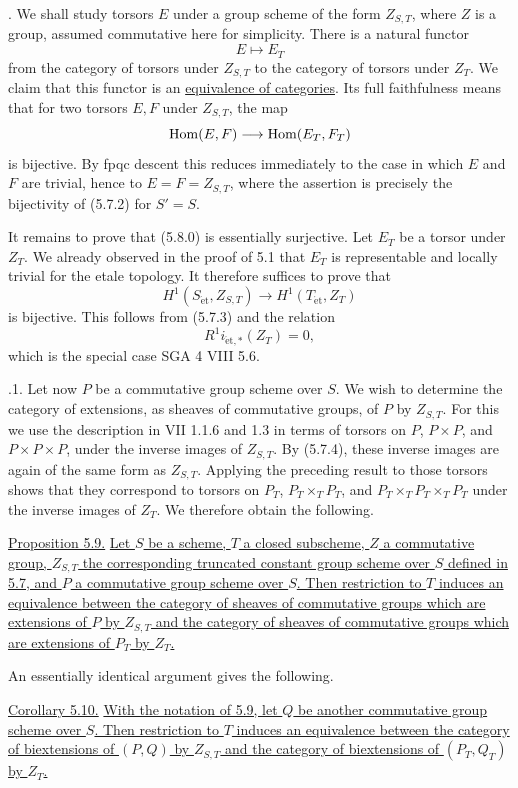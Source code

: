 \medskip
{}.  We shall study torsors $E$ under a group scheme of the
form $Z_{S,T}$, where $Z$ is a group, assumed commutative here for
simplicity.  There is a natural functor
\begin{equation}\tag{5.8.0}
 E\longmapsto E_T
\end{equation}
from the category of torsors under $Z_{S,T}$ to the category of
torsors under $Z_T$.  We claim that this functor is an
\underline{equivalence of categories}.  Its full faithfulness means
that for two torsors $E,F$ under $Z_{S,T}$, the map
\[
 \operatorname{Hom}(E,F)\longrightarrow\operatorname{Hom}(E_T,F_T)
\]
is bijective.  By fpqc descent this reduces immediately to the case in
which $E$ and $F$ are trivial, hence to $E=F=Z_{S,T}$, where the
assertion is precisely the bijectivity of (5.7.2) for $S'=S$.

It remains to prove that (5.8.0) is essentially surjective.  Let $E_T$
be a torsor under $Z_T$.  We already observed in the proof of 5.1 that
$E_T$ is representable and locally trivial for the etale topology.  It
therefore suffices to prove that
\[
 H^1(S_{\mathrm{\acute{e}t}},Z_{S,T})
 \longrightarrow H^1(T_{\mathrm{\acute{e}t}},Z_T)
\]
is bijective.  This follows from (5.7.3) and the relation
\[
 R^1i_{\mathrm{\acute{e}t},*}(Z_T)=0,
\]
which is the special case SGA 4 VIII 5.6.

\medskip
{}.1.  Let now $P$ be a commutative group scheme over $S$.
We wish to determine the category of extensions, as sheaves of
commutative groups, of $P$ by $Z_{S,T}$.  For this we use the
description in VII 1.1.6 and 1.3 in terms of torsors on
$P$, $P\times P$, and $P\times P\times P$, under the inverse images
of $Z_{S,T}$.  By (5.7.4), these inverse images are again of the same
form as $Z_{S,T}$.  Applying the preceding result to those torsors
shows that they correspond to torsors on
$P_T$, $P_T\times_TP_T$, and
$P_T\times_TP_T\times_TP_T$ under the inverse images of $Z_T$.
We therefore obtain the following.

\medskip
\noindent\underline{Proposition 5.9.}  \underline{Let $S$ be a scheme,
$T$ a closed subscheme, $Z$ a commutative group, $Z_{S,T}$ the
corresponding truncated constant group scheme over $S$ defined in
5.7, and $P$ a commutative group scheme over $S$.  Then restriction to
$T$ induces an equivalence between the category of sheaves of
commutative groups which are extensions of $P$ by $Z_{S,T}$ and the
category of sheaves of commutative groups which are extensions of
$P_T$ by $Z_T$.}

An essentially identical argument gives the following.

\medskip
\noindent\underline{Corollary 5.10.}  \underline{With the notation of
5.9, let $Q$ be another commutative group scheme over $S$.  Then
restriction to $T$ induces an equivalence between the category of
biextensions of $(P,Q)$ by $Z_{S,T}$ and the category of biextensions
of $(P_T,Q_T)$ by $Z_T$.}

